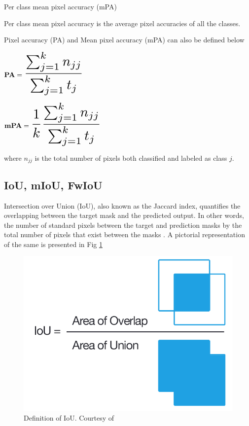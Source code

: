     
    Per class mean pixel accuracy (mPA)
    
    Per class mean pixel accuracy is the average pixel accuracies of all the classes.
    
    Pixel accuracy (PA) and Mean pixel accuracy (mPA) can also be defined below \cite{84_ulku2022survey}
    
    $
    {\bf PA } = \scalemath{2}{\frac{\sum_{j=1}^{k} n_{jj}}{\sum_{j=1}^{k} t_j} }
    $
    
    $
    {\bf mPA } = \scalemath{2}{\frac{1}{k} \frac{\sum_{j=1}^{k} n_{jj}}{\sum_{j=1}^{k} t_j}}
    $
    
    where $n_{jj}$ is the total number of pixels both classified and labeled as class $j$. 
    
    \subsection{IoU, mIoU, FwIoU}
    
    Intersection over Union (IoU), also known as the Jaccard index, quantifies the overlapping between the target mask and the predicted output. In other words, the number of standard pixels between the target and prediction masks by the total number of pixels that exist between the masks \cite{83_iou}. A pictorial representation of the same is presented in Fig \ref{fig:IoU}
    
    \begin{figure}[h]
    	\centering
    	\includegraphics[width=12cm]{images/IoU.png}
    	\caption{Definition of IoU. Courtesy of \cite{82_iou}}
    	\label{fig:IoU}
    \end{figure}  
	
